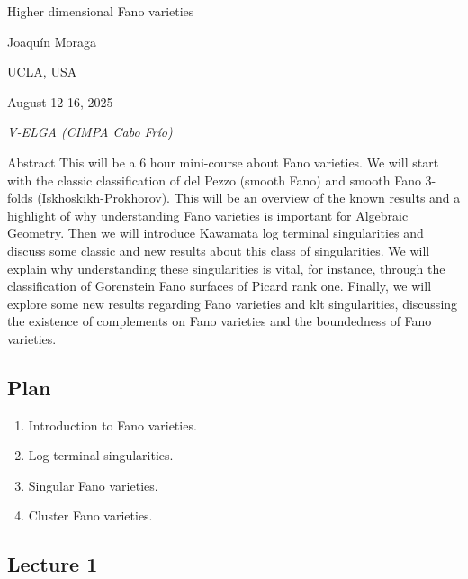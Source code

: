 \clearpage{}
{\Huge Higher dimensional Fano varieties}

\hfill{\Large Joaquín Moraga}

{\Large \hfill UCLA, USA}

\hfill{\large August 12-16, 2025

\hfill \textit{V-ELGA (CIMPA Cabo Frío)}}

\vspace{2em}

\begin{thing4}{Abstract}
This will be a 6 hour mini-course about Fano varieties.
We will start with the classic classification of del Pezzo (smooth
Fano) and smooth Fano 3-folds (Iskhoskikh-Prokhorov). This will
be an overview of the known results and a highlight of why understanding Fano varieties is important for Algebraic Geometry. Then
we will introduce Kawamata log terminal singularities and discuss
some classic and new results about this class of singularities. We will
explain why understanding these singularities is vital, for instance,
through the classification of Gorenstein Fano surfaces of Picard rank
one. Finally, we will explore some new results regarding Fano varieties and klt singularities, discussing the existence of complements
on Fano varieties and the boundedness of Fano varieties.
\end{thing4}
\vspace{2em}

\subsection*{Plan}

\begin{enumerate}
	\item Introduction to Fano varieties.
	\item Log terminal singularities.
	\item Singular Fano varieties.
	\item Cluster Fano varieties.
\end{enumerate}

\subsection{Lecture 1}

